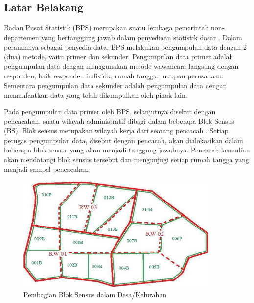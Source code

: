 \chapter{\babSatu}

\section{Latar Belakang}

Badan Pusat Statistik (BPS) merupakan suatu lembaga pemerintah non-departemen yang bertanggung jawab dalam penyediaan statistik dasar \citep{bps_badan_2016}. Dalam peranannya sebagai penyedia data, BPS melakukan pengumpulan data dengan 2 (dua) metode, yaitu primer dan sekunder. Pengumpulan data primer adalah pengumpulan data dengan menggunakan metode wawancara langsung dengan responden, baik responden individu, rumah tangga, maupun perusahaan. Sementara pengumpulan data sekunder adalah pengumpulan data dengan memanfaatkan data yang telah dikumpulkan oleh pihak lain.


Pada pengumpulan data primer oleh BPS, selanjutnya disebut dengan pencacahan, suatu wilayah administratif dibagi dalam beberapa Blok Sensus (BS). Blok sensus merupakan wilayah kerja dari seorang pencacah \citep{bps_sistem_2016}. Setiap petugas pengumpulan data, disebut dengan pencacah, akan dialokasikan dalam beberapa blok sensus yang akan menjadi tanggung jawabnya. Pencacah kemudian akan mendatangi blok sensus tersebut dan mengunjugi setiap rumah tangga yang menjadi sampel pencacahan.


\begin{figure}[!]
    \centering
    \includegraphics[width=10cm]{../../Resources/Images/peta_kelurahan_per_bs}
    \caption{Pembagian Blok Sensus dalam Desa/Kelurahan}
    \label{fig:capi-ilustration}
\end{figure}


